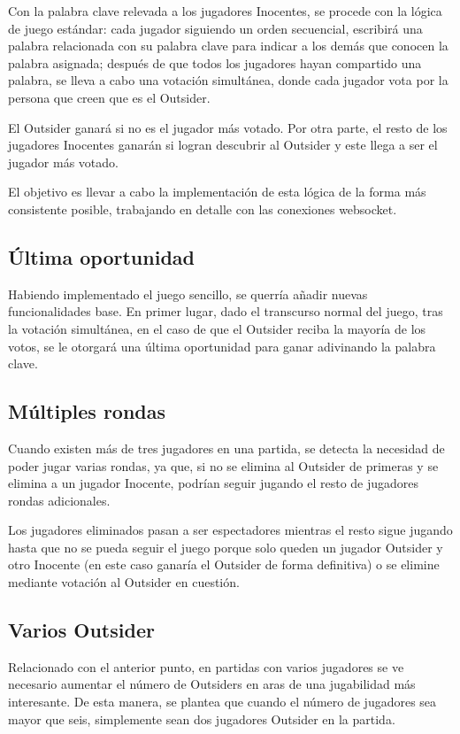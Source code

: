 Con la palabra clave relevada a los jugadores Inocentes, se procede con la lógica de juego estándar: cada jugador siguiendo 
un orden secuencial, escribirá una palabra relacionada con su palabra clave
para indicar a los demás que conocen la palabra asignada; después de que todos los jugadores hayan compartido una
palabra, se lleva a cabo una votación simultánea, donde cada jugador vota por la persona que creen
que es el Outsider.

El Outsider ganará si no es el jugador más votado. Por otra parte, el resto de los jugadores Inocentes ganarán
si logran descubrir al Outsider y este llega a ser el jugador más votado.

El objetivo es llevar a cabo la implementación de esta lógica de la forma más consistente posible, trabajando en
detalle con las conexiones websocket.

\subsection{Última oportunidad}

Habiendo implementado el juego sencillo, se querría añadir nuevas funcionalidades base. En primer lugar, dado el transcurso
normal del juego, tras la votación simultánea, en el caso de que el Outsider reciba la mayoría de los votos, se le otorgará
una última oportunidad para ganar adivinando la palabra clave.

\subsection{Múltiples rondas}

Cuando existen más de tres jugadores en una partida, se detecta la necesidad de poder jugar varias rondas,
ya que, si no se elimina al Outsider de primeras y se elimina a un jugador Inocente, podrían seguir jugando el resto de jugadores
rondas adicionales.

Los jugadores eliminados pasan a ser espectadores mientras el resto sigue jugando hasta que no 
se pueda seguir el juego porque solo queden un jugador Outsider y otro Inocente (en este caso
ganaría el Outsider de forma definitiva) o se elimine mediante votación al Outsider en cuestión.

\subsection{Varios Outsider}

Relacionado con el anterior punto, en partidas con varios jugadores se ve necesario aumentar el número de Outsiders en aras de
una jugabilidad más interesante. De esta manera, se plantea que cuando el número de jugadores sea mayor que seis, simplemente sean
dos jugadores Outsider en la partida.

